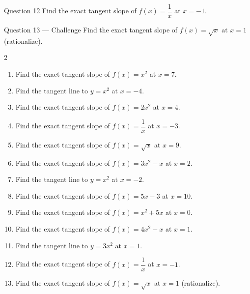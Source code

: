 \documentclass[11pt]{article}
\begin{document}
\begin{qbox}{Question 12}
Find the exact tangent slope of $f(x)=\dfrac1x$ at $x=-1$.\workspace{2.4cm}
\end{qbox}

\begin{qbox}{Question 13 --- Challenge}
Find the exact tangent slope of $f(x)=\sqrt{x}$ at $x=1$ (rationalize).\workspace{3.5cm}
\end{qbox}

\clearpage
{}

\begin{recapbox}
\begin{multicols}{2}
\small
\begin{enumerate}[leftmargin=*,itemsep=3pt]
  \item Find the exact tangent slope of $f(x)=x^2$ at $x=7$.
  \item Find the tangent line to $y=x^2$ at $x=-4$.
  \item Find the exact tangent slope of $f(x)=2x^2$ at $x=4$.
  \item Find the exact tangent slope of $f(x)=\dfrac1x$ at $x=-3$.
  \item Find the exact tangent slope of $f(x)=\sqrt{x}$ at $x=9$.
  \item Find the exact tangent slope of $f(x)=3x^2-x$ at $x=2$.
  \item Find the tangent line to $y=x^2$ at $x=-2$.
  \item Find the exact tangent slope of $f(x)=5x-3$ at $x=10$.
  \item Find the exact tangent slope of $f(x)=x^2+5x$ at $x=0$.
  \item Find the exact tangent slope of $f(x)=4x^2-x$ at $x=1$.
  \item Find the tangent line to $y=3x^2$ at $x=1$.
  \item Find the exact tangent slope of $f(x)=\dfrac1x$ at $x=-1$.
  \item Find the exact tangent slope of $f(x)=\sqrt{x}$ at $x=1$ (rationalize).
\end{enumerate}
\end{multicols}
\end{recapbox}
\end{document}
